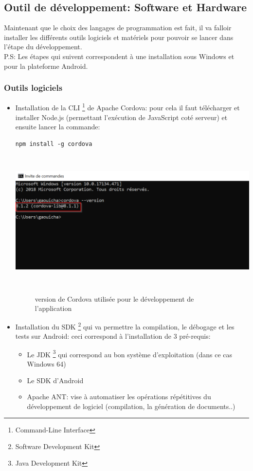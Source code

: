\documentclass{report}
\begin{document}
\subsection{Outil de développement: Software et Hardware}
Maintenant que le choix des langages de programmation est fait, il va falloir installer les différents outils logiciels et matériels pour pouvoir se lancer dans l'étape du développement.\\
P.S: Les étapes qui suivent correspondent à une installation sous Windows et pour la plateforme Android.
\subsubsection{Outils logiciels}
\begin{itemize}
    \item Installation de la CLI \footnote{Command-Line Interface} de Apache Cordova: pour cela il faut télécharger et installer Node.js (permettant l'exécution de JavaScript coté serveur) et ensuite lancer la commande:
    \begin{center}
        \texttt{npm install -g cordova}\\
    \end{center}
    
    \begin{center}
    \includegraphics[height=200pt]{cordova.png}
    \end{center}
    \begin{figure}[H]
        \centering
        \caption{version de Cordova utilisée pour le développement de l'application}
        \label{fig:cordova}
    \end{figure}

    \item Installation du SDK \footnote{Software Development Kit} qui va permettre la compilation, le débogage et les tests sur Android: ceci correspond à l'installation de 3 pré-requis:
    \begin{itemize}
        \item Le JDK \footnote{Java Development Kit} qui correspond au bon système d'exploitation (dans ce cas Windows 64)
        \item Le SDK d'Android
        \item Apache ANT: vise à automatiser les opérations répétitives du développement de logiciel (compilation, la génération de documents..)
    \end{itemize}
    

\end{itemize}
\end{document}
